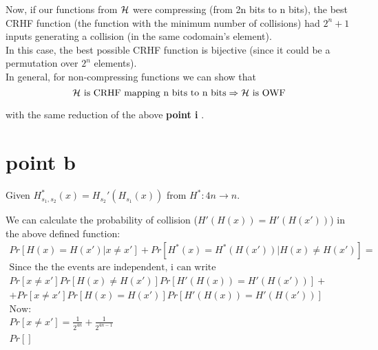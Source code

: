 Now, if our functions from $\mathcal{H}$ were compressing (from 2n bits to n bits), the
best CRHF function (the function with the minimum number of collisions) had
$2^{n} + 1 $ inputs generating a collision (in the same codomain's element).\\

In this case, the best possible CRHF function is bijective (since it could be a permutation over $2^{n}$ elements).\\

In general, for non-compressing functions we can show that 
\[
    \mathcal{H} \text{ is CRHF mapping n bits to n bits}  \Rightarrow \mathcal{H} \text{ is OWF}
\]

with the same reduction of the above \textbf{point i} .

\section{point b}

Given $H_{s_1,s_2}^*(x)=H_{s_2}'(H_{s_1}(x))$ from $H^*:4n \rightarrow n$.

We can calculate the probability of collision ($H'(H(x))=H'(H(x'))$) in the above defined function:
\begin{gather*}
    Pr[H(x)=H(x') | x \neq x' ]+Pr[H^{*}(x)=H^{*}(H(x')) | H(x) \neq H(x') ]=\\
    \text{Since the the events are independent, i can write}\\
    Pr[ x \neq x' ] Pr[ H(x) \neq H(x') ] Pr[ H'(H(x))=H'(H(x')) ] +\\
    + Pr[ x \neq x' ] Pr[ H(x) = H(x') ] Pr[ H'(H(x))=H'(H(x')) ]\\
    \text{Now:}\\
    Pr[ x \neq x' ]=\frac{1}{2^{4n}}+\frac{1}{2^{4n-1}}\\
    Pr[ ]
\end{gather*}